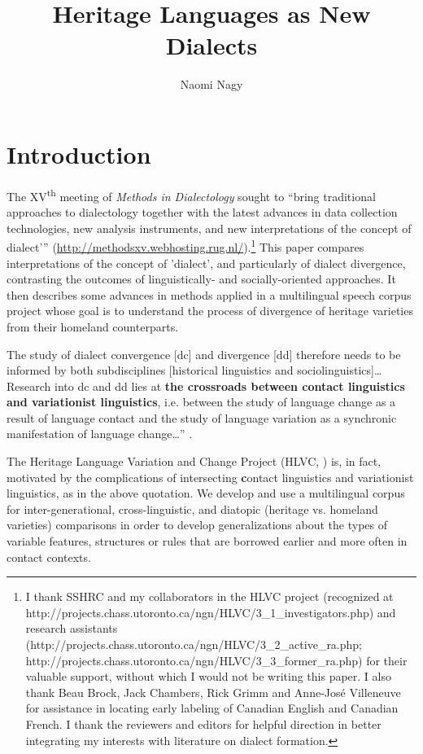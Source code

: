 \documentclass[output=paper]{LSP/langsci}
\author{Naomi Nagy\affiliation{University of Toronto, Department of Linguistics }}
\title{Heritage Languages as New Dialects}
\begin{document}
% 


\section{Introduction}
The XV\textsuperscript{th} meeting of \textit{Methods in Dialectology} sought to “bring traditional approaches to dialectology together with the latest advances in data collection technologies, new analysis instruments, and new interpretations of the concept of dialect'” (\url{http://methodsxv.webhosting.rug.nl/}).\footnote{ I thank SSHRC and my collaborators in the HLVC project (recognized at http://projects.chass.utoronto.ca/ngn/HLVC/3\_1\_investigators.php) and research assistants (http://projects.chass.utoronto.ca/ngn/HLVC/3\_2\_active\_ra.php; http://projects.chass.utoronto.ca/ngn/HLVC/3\_3\_former\_ra.php) for their valuable support, without which I would not be writing this paper. I also thank Beau Brock, Jack Chambers, Rick Grimm and Anne-José Villeneuve for assistance in locating early labeling of Canadian English and Canadian French. I thank the reviewers and editors for helpful direction in better integrating my interests with literature on dialect formation.
} This paper compares interpretations of the concept of 'dialect', and particularly of dialect divergence, contrasting the outcomes of linguistically- and socially-oriented approaches. It then describes some advances in methods applied in a multilingual speech corpus project whose goal is to understand the process of divergence of heritage varieties from their homeland counterparts.

The study of dialect convergence [dc] and divergence [dd] therefore needs to be informed by both subdisciplines [historical linguistics and sociolinguistics]… Research into dc and dd lies at \textbf{the crossroads between contact linguistics and variationist linguistics}, i.e. between the study of language change as a result of language contact and the study of language variation as a synchronic manifestation of language change…” \citep[16]{auer_study_2004}.

The Heritage Language Variation and Change Project (HLVC, \citealt{nagy_multilingual_2011}) is, in fact, motivated by the complications of intersecting \textbf{c}ontact linguistics and variationist linguistics, as in the above quotation. We develop and use a multilingual corpus for inter-generational, cross-linguistic, and diatopic (heritage vs. homeland varieties) comparisons in order to develop generalizations about the types of variable features, structures or rules that are borrowed earlier and more often in contact contexts.  
\end{document}
